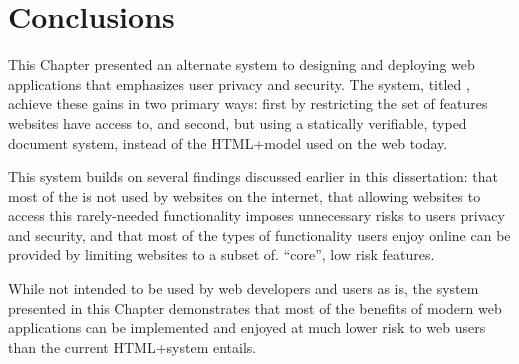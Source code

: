 \section{Conclusions}
\label{future-web:conclusions}

This Chapter presented an alternate system to designing and deploying web
applications that emphasizes user privacy and security.  The system, titled
\CDF, achieve these gains in two primary ways: first by restricting the
set of \WAPI features websites have access to, and second, but using a
statically verifiable, typed document system, instead of the HTML+\JS model
used on the web today.

This system builds on several findings discussed earlier in this dissertation:
that most of the \WAPI is not used by websites on the internet, that allowing
websites to access this rarely-needed functionality imposes unnecessary risks to
users privacy and security, and that most of the types of functionality
users enjoy online can be provided by limiting websites to a subset of.
``core'', low risk \WAPI features.

While not intended to be used by web developers and users as is, the \CDF
system presented in this Chapter demonstrates that most of the benefits of
modern web applications can be implemented and enjoyed at much lower risk
to web users than the current HTML+\JS system entails.
